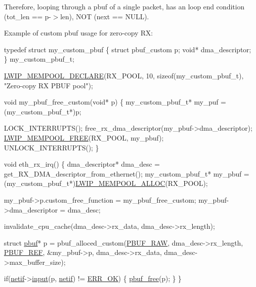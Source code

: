 Therefore, looping through a pbuf of a single packet, has an loop end condition (tot\+\_\+len == p-\/$>$len), N\+OT (next == N\+U\+LL).

Example of custom pbuf usage for zero-\/copy RX\+: 
\begin{DoxyCode}
\textcolor{keyword}{typedef} \textcolor{keyword}{struct }my\_custom\_pbuf
\{
   \textcolor{keyword}{struct }pbuf\_custom p;
   \textcolor{keywordtype}{void}* dma\_descriptor;
\} my\_custom\_pbuf\_t;

\hyperlink{group__mempool_ga5b1fb3ce7942432d87cc948b1c5ed6cb}{LWIP\_MEMPOOL\_DECLARE}(RX\_POOL, 10, \textcolor{keyword}{sizeof}(my\_custom\_pbuf\_t), \textcolor{stringliteral}{"Zero-copy RX PBUF pool"});

\textcolor{keywordtype}{void} my\_pbuf\_free\_custom(\textcolor{keywordtype}{void}* p)
\{
  my\_custom\_pbuf\_t* my\_puf = (my\_custom\_pbuf\_t*)p;

  LOCK\_INTERRUPTS();
  free\_rx\_dma\_descriptor(my\_pbuf->dma\_descriptor);
  \hyperlink{group__mempool_gaa43d114dd702fbd8f1db18474ea93a04}{LWIP\_MEMPOOL\_FREE}(RX\_POOL, my\_pbuf);
  UNLOCK\_INTERRUPTS();
\}

\textcolor{keywordtype}{void} eth\_rx\_irq()
\{
  dma\_descriptor*   dma\_desc = get\_RX\_DMA\_descriptor\_from\_ethernet();
  my\_custom\_pbuf\_t* my\_pbuf  = (my\_custom\_pbuf\_t*)\hyperlink{group__mempool_ga5e2498f6c17746c1fe7153de5f7f275a}{LWIP\_MEMPOOL\_ALLOC}(RX\_POOL);

  my\_pbuf->p.custom\_free\_function = my\_pbuf\_free\_custom;
  my\_pbuf->dma\_descriptor         = dma\_desc;

  invalidate\_cpu\_cache(dma\_desc->rx\_data, dma\_desc->rx\_length);
  
  \textcolor{keyword}{struct }\hyperlink{structpbuf}{pbuf}* p = pbuf\_alloced\_custom(\hyperlink{group__pbuf_ggaee1baa59bb2f85ba575b5a8619ac1ebfa21116654fbab6d5a4dfeb87a1bb8f0ba}{PBUF\_RAW},
     dma\_desc->rx\_length,
     \hyperlink{group__pbuf_ggab7e0e32fcc292c0d7107721766ed92fbac9b6ba960fdea6f2e8f35c8313b77e4e}{PBUF\_REF},
     &my\_pbuf->p,
     dma\_desc->rx\_data,
     dma\_desc->max\_buffer\_size);

  \textcolor{keywordflow}{if}(\hyperlink{structnetif}{netif}->\hyperlink{structnetif_a8fe4f1b7b0d710216287da9615164a5c}{input}(p, \hyperlink{structnetif}{netif}) != \hyperlink{group__infrastructure__errors_ggae2e66c7d13afc90ffecd6151680fbadcaa26c163b80b1f6786ca81dadc14b00fb}{ERR\_OK}) \{
    \hyperlink{group__pbuf_gab0dd696fb4b6bc65e548944584f1738b}{pbuf\_free}(p);
  \}
\}
\end{DoxyCode}
 

